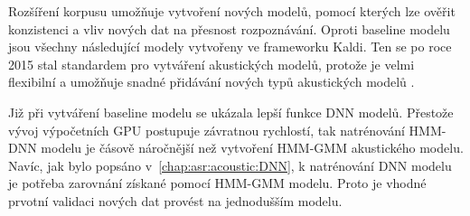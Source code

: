 
Rozšíření korpusu umožňuje vytvoření nových modelů, pomocí kterých lze ověřit konzistenci a vliv nových dat na přesnost rozpoznávání.
Oproti baseline modelu jsou všechny následující modely vytvořeny ve frameworku Kaldi.
Ten se po roce 2015 stal standardem pro vytváření akustických modelů, protože je velmi flexibilní a umožňuje snadné přidávání nových typů akustických modelů \cite{Kaldi2011}.


Již při vytváření baseline modelu se ukázala lepší funkce DNN modelů.
Přestože vývoj výpočetních GPU postupuje závratnou rychlostí, tak natrénování HMM-DNN modelu je čásově náročnější než vytvoření HMM-GMM akustického modelu.
Navíc, jak bylo popsáno v~\ref{chap:asr:acoustic:DNN}, k natrénování DNN modelu je potřeba zarovnání získané pomocí HMM-GMM modelu.
Proto je vhodné prvotní validaci nových dat provést na jednodušším modelu.



